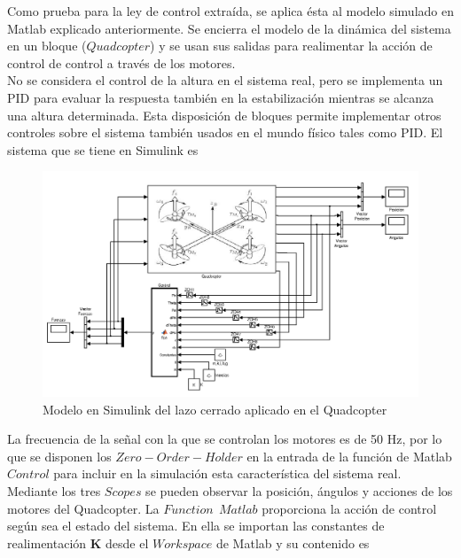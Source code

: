 \documentclass[twoside,11pt]{book}
\begin{document}
Como prueba para la ley de control extraída, se aplica ésta al modelo simulado en Matlab explicado anteriormente. Se encierra el modelo de la dinámica del sistema en un bloque ($Quadcopter$) y se usan sus salidas para realimentar la acción de control de control a través de los motores. \\

No se considera el control de la altura en el sistema real, pero se implementa un PID para evaluar la respuesta también en la estabilización mientras se alcanza una altura determinada. Esta disposición de bloques permite implementar otros controles sobre el sistema también usados en el mundo físico tales como PID. El sistema que se tiene en Simulink es

\newpage

\begin{center}
\begin{figure}[h!]
\includegraphics[scale=0.43,bb=0 0 650 600]{images/Simulink_model_2.png}
\caption{Modelo en Simulink del lazo cerrado aplicado en el Quadcopter}
\end{figure}
\end{center}

La frecuencia de la señal con la que se controlan los motores es de 50 Hz, por lo que se disponen los $Zero-Order-Holder$ en la entrada de la función de Matlab $Control$ para incluir en la simulación esta característica del sistema real.\\ 
Mediante los tres $Scopes$ se pueden observar la posición, ángulos y acciones de los motores del Quadcopter. La $Function \>\> Matlab$ proporciona la acción de control según sea el estado del sistema. En ella se importan las constantes de realimentación $\mathbf{K}$ desde el $Workspace$ de Matlab y su contenido es
\end{document}
